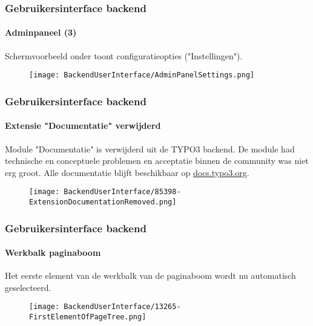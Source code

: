 
\begin{frame}[fragile]
	\frametitle{Gebruikersinterface backend}
	\framesubtitle{Adminpaneel (3)}

	Schermvoorbeeld onder toont configuratieopties ("Instellingen").

	\begin{figure}
		\texttt{[image: BackendUserInterface/AdminPanelSettings.png]}
	\end{figure}

\end{frame}


\begin{frame}[fragile]
	\frametitle{Gebruikersinterface backend}
	\framesubtitle{Extensie "Documentatie" verwijderd}

	Module "Documentatie" is verwijderd uit de TYPO3 backend.
    De module had technische en conceptuele problemen en acceptatie binnen de
    community was niet erg groot.
    \newline
    Alle documentatie blijft beschikbaar op \href{https://docs.typo3.org}{docs.typo3.org}.

	\begin{figure}
		\texttt{[image: BackendUserInterface/85398-ExtensionDocumentationRemoved.png]}
	\end{figure}

\end{frame}


\begin{frame}[fragile]
	\frametitle{Gebruikersinterface backend}
	\framesubtitle{Werkbalk paginaboom}

	Het eerste element van de werkbalk van de paginaboom wordt nu automatisch
	geselecteerd.

	\begin{figure}
		\texttt{[image: BackendUserInterface/13265-FirstElementOfPageTree.png]}
	\end{figure}

\end{frame}

